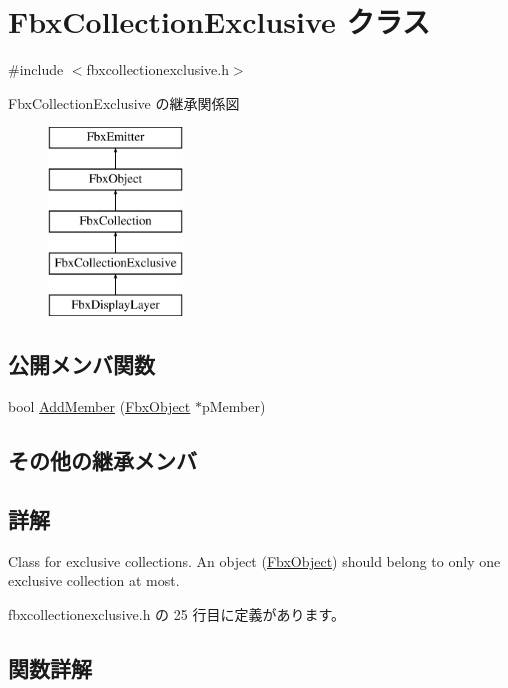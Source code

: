 \hypertarget{class_fbx_collection_exclusive}{}\section{Fbx\+Collection\+Exclusive クラス}
\label{class_fbx_collection_exclusive}


{\ttfamily \#include $<$fbxcollectionexclusive.\+h$>$}

Fbx\+Collection\+Exclusive の継承関係図\begin{figure}[H]
\begin{center}
\leavevmode
\includegraphics[height=5.000000cm]{class_fbx_collection_exclusive}
\end{center}
\end{figure}
\subsection*{公開メンバ関数}
\begin{DoxyCompactItemize}
\item 
bool \hyperlink{class_fbx_collection_exclusive_ab39aa1d3200f5cc628685d7c9eca6fb2}{Add\+Member} (\hyperlink{class_fbx_object}{Fbx\+Object} $\ast$p\+Member)
\end{DoxyCompactItemize}
\subsection*{その他の継承メンバ}


\subsection{詳解}
Class for exclusive collections. An object (\hyperlink{class_fbx_object}{Fbx\+Object}) should belong to only one exclusive collection at most. 

 fbxcollectionexclusive.\+h の 25 行目に定義があります。



\subsection{関数詳解}
\mbox{\label{class_fbx_collection_exclusive_ab39aa1d3200f5cc628685d7c9eca6fb2}} 
